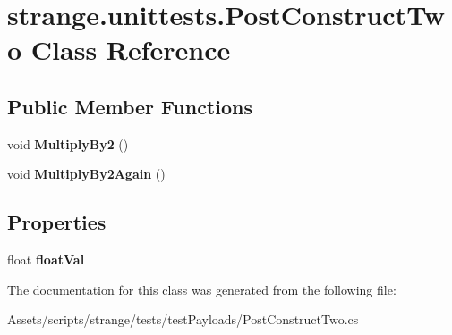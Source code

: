 \hypertarget{classstrange_1_1unittests_1_1_post_construct_two}{\section{strange.\-unittests.\-Post\-Construct\-Two Class Reference}
\label{classstrange_1_1unittests_1_1_post_construct_two}
}
\subsection*{Public Member Functions}
\begin{DoxyCompactItemize}
\item 
\hypertarget{classstrange_1_1unittests_1_1_post_construct_two_a2648d451002c5af5c0b6163e452ad900}{void {\bfseries Multiply\-By2} ()}\label{classstrange_1_1unittests_1_1_post_construct_two_a2648d451002c5af5c0b6163e452ad900}

\item 
\hypertarget{classstrange_1_1unittests_1_1_post_construct_two_a787e5454c525ce78d8d34e8c9e84fe2e}{void {\bfseries Multiply\-By2\-Again} ()}\label{classstrange_1_1unittests_1_1_post_construct_two_a787e5454c525ce78d8d34e8c9e84fe2e}

\end{DoxyCompactItemize}
\subsection*{Properties}
\begin{DoxyCompactItemize}
\item 
\hypertarget{classstrange_1_1unittests_1_1_post_construct_two_a113444c8eabee2ca6c4389e8a53c19cc}{float {\bfseries float\-Val}}\label{classstrange_1_1unittests_1_1_post_construct_two_a113444c8eabee2ca6c4389e8a53c19cc}

\end{DoxyCompactItemize}


The documentation for this class was generated from the following file\-:\begin{DoxyCompactItemize}
\item 
Assets/scripts/strange/tests/test\-Payloads/Post\-Construct\-Two.\-cs\end{DoxyCompactItemize}
